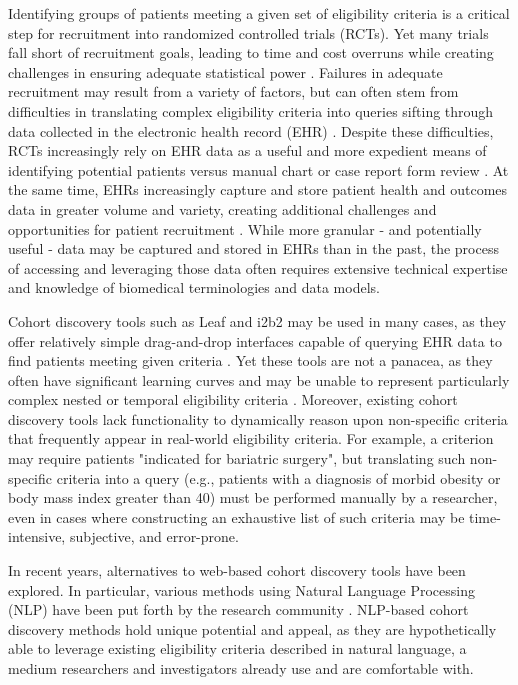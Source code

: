 \documentclass[../main.tex]{subfiles}
\begin{document}
Identifying groups of patients meeting a given set of eligibility criteria is a critical step for recruitment into randomized controlled trials (RCTs). Yet many trials fall short of recruitment goals, leading to time and cost overruns while creating challenges in ensuring adequate statistical power \cite{gul2010clinical, adams2015barriers}. Failures in adequate recruitment may result from a variety of factors, but can often stem from difficulties in translating complex eligibility criteria into queries sifting through data collected in the electronic health record (EHR) \cite{wang2017classifying}. Despite these difficulties, RCTs increasingly rely on EHR data as a useful and more expedient means of identifying potential patients versus manual chart or case report form review \cite{cowie2017electronic}. At the same time, EHRs increasingly capture and store patient health and outcomes data in greater volume and variety, creating additional challenges and opportunities for patient recruitment \cite{lee2017medical}. While more granular - and potentially useful - data may be captured and stored in EHRs than in the past, the process of accessing and leveraging those data often requires extensive technical expertise and knowledge of biomedical terminologies and data models. 

Cohort discovery tools such as Leaf \cite{dobbins2019leaf} and i2b2 \cite{murphy2010serving} may be used in many cases, as they offer relatively simple drag-and-drop interfaces capable of querying EHR data to find patients meeting given criteria \cite{johnson2014use}. Yet these tools are not a panacea, as they often have significant learning curves and may be unable to represent particularly complex nested or temporal eligibility criteria \cite{deshmukh2009evaluating}. Moreover, existing cohort discovery tools lack functionality to dynamically reason upon non-specific criteria that frequently appear in real-world eligibility criteria. For example, a criterion may require patients "indicated for bariatric surgery", but translating such non-specific criteria into a query (e.g., patients with a diagnosis of morbid obesity or body mass index greater than 40) must be performed manually by a researcher, even in cases where constructing an exhaustive list of such criteria may be time-intensive, subjective, and error-prone. 

In recent years, alternatives to web-based cohort discovery tools have been explored. In particular, various methods using Natural Language Processing (NLP) have been put forth by the research community \cite{yuan2019criteria2query, soni2020patient, fang2022combining, zhang2020deepenroll, chen2019clinical, patrao2015recruit, dhayne2021emr2vec, liu2021evaluating, xiong2019cohort}. NLP-based cohort discovery methods hold unique potential and appeal, as they are hypothetically able to leverage existing eligibility criteria described in natural language, a medium researchers and investigators already use and are comfortable with.
\end{document}
